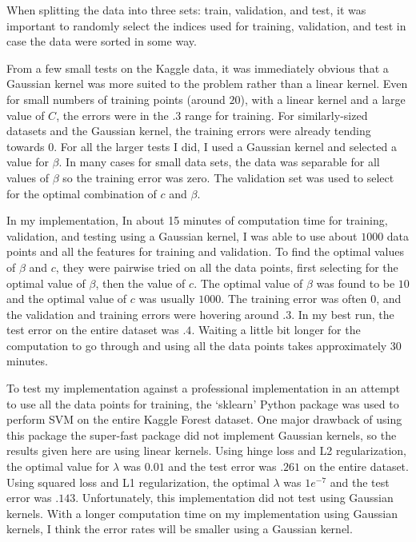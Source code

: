\documentclass[10pt]{article}
\begin{document}
When splitting the data into three sets: train, validation, and test, it was important to randomly select the indices used for training, validation, and test in case the data were sorted in some way. 

From a few small tests on the Kaggle data, it was immediately obvious that a Gaussian kernel was more suited to the problem rather than a linear kernel. Even for small numbers of training points (around $20$), with a linear kernel and a large value of $C$, the errors were in the $.3$ range for training. For similarly-sized datasets and the Gaussian kernel, the training errors were already tending towards $0$. For all the larger tests I did, I used a Gaussian kernel and selected a value for $\beta$. In many cases for small data sets, the data was separable for all values of $\beta$ so the training error was zero. The validation set was used to select for the optimal combination of $c$ and $\beta$.

In my implementation, In about 15 minutes of computation time for training, validation, and testing using a Gaussian kernel, I was able to use about $1000$ data points and all the features for training and validation. To find the optimal values of $\beta$ and $c$, they were pairwise tried on all the data points, first selecting for the optimal value of $\beta$, then the value of $c$. The optimal value of $\beta$ was found to be $10$ and the optimal value of $c$ was usually $1000$. The training error was often $0$, and the validation and training errors were hovering around $.3$. In my best run, the test error on the entire dataset was $.4$. Waiting a little bit longer for the computation to go through and using all the data points takes approximately 30 minutes.

To test my implementation against a professional implementation in an attempt to use all the data points for training, the `sklearn' Python package was used to perform SVM on the entire Kaggle Forest dataset. One major drawback of using this package the super-fast package did not implement Gaussian kernels, so the results given here are using linear kernels. Using hinge loss and L2 regularization, the optimal value for $\lambda$ was $0.01$ and the test error was $.261$ on the entire dataset. Using squared loss and L1 regularization, the optimal $\lambda$ was $1e^{-7}$ and the test error was $.143$. Unfortunately, this implementation did not test using Gaussian kernels. With a longer computation time on my implementation using Gaussian kernels, I think the error rates will be smaller using a Gaussian kernel.
\end{document}
